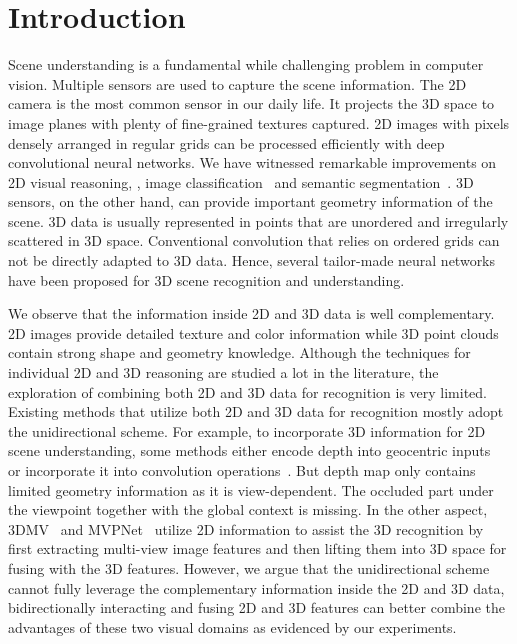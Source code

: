 \documentclass[final]{cvpr}
\begin{document}
\section{Introduction}
\label{sec:introduction}
Scene understanding is a fundamental while challenging problem in computer vision. Multiple sensors are used to capture the scene information. 
The 2D camera is the most common sensor in our daily life. It projects the 3D space to image planes with plenty of fine-grained textures captured. 2D images with pixels densely arranged in regular grids can be processed efficiently with deep convolutional neural networks. We have witnessed remarkable improvements on 2D visual reasoning, \eg, image classification~\cite{krizhevsky2012imagenet,szegedy2015going,simonyan2015very,he2016deep} and semantic segmentation~\cite{long2015fully,chen2015semantic,yu2016multi,zhao2017pyramid}. 
3D sensors, on the other hand, can provide important geometry information of the scene. 3D data is usually represented in points that are unordered and irregularly scattered in 3D space. Conventional convolution that relies on ordered grids can not be directly adapted to 3D data.
Hence, several tailor-made neural networks~\cite{qi2017pointnet,li2018pointcnn,sscn2018} have been proposed for 3D scene recognition and understanding.


We observe that the information inside 2D and 3D data is well complementary. 2D images provide detailed texture and color information while 3D point clouds contain strong shape and geometry knowledge.  
Although the techniques for individual 2D and 3D reasoning are studied a lot in the literature, the exploration of combining both 2D and 3D data for recognition is very limited. 
Existing methods that utilize both 2D and 3D data for recognition mostly adopt the unidirectional scheme.
For example, to incorporate 3D information for 2D scene understanding, some methods either encode depth into geocentric inputs~\cite{gupta2014learning} or incorporate it into convolution operations~\cite{qi20173d,wang2018depth}. 
But depth map only contains limited geometry information as it is view-dependent. The occluded part under the viewpoint together with the global context is missing. 
In the other aspect, 3DMV~\cite{dai20183dmv} and MVPNet~\cite{jaritz2019multi} utilize 2D information to assist the 3D recognition by first extracting multi-view image features and then lifting them into 3D space for fusing with the 3D features. 
However, we argue that the unidirectional scheme cannot fully leverage the complementary information inside the 2D and 3D data, bidirectionally interacting and fusing 2D and 3D features can better combine the advantages of these two visual domains as evidenced by our experiments.
\end{document}
